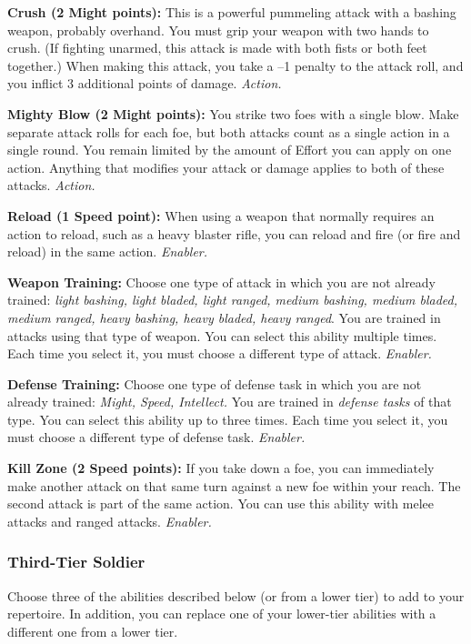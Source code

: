 \documentclass[a4paper,10pt,final,twocolumn,oneside]{book}
\newcommand{\itemAbility}[2]{\textcolor{25gray}{\textbullet\textbf{ #1:}}{ #2}\par}
\newcommand{\enabler}{\textit{ Enabler.}}
\newcommand{\action}{\textit{ Action.}}
\begin{document}
\itemAbility{Crush (2 Might points)}{This is a powerful pummeling attack with a bashing weapon, probably overhand. You must grip your weapon with two hands to crush. (If fighting unarmed, this attack is made with both fists or both feet together.) When making this attack, you take a –1 penalty to the attack roll, and you inflict 3 additional points of damage.\action}

\itemAbility{Mighty Blow (2 Might points)}{You strike two foes with a single blow. Make separate attack rolls for each foe, but both attacks count as a single action in a single round. You remain limited by the amount of Effort you can apply on one action. Anything that modifies your attack or damage applies to both of these attacks.\action}

\itemAbility{Reload (1 Speed point)}{When using a weapon that normally requires an action to reload, such as a heavy blaster rifle, you can reload and fire (or fire and reload) in the same action.\enabler}

\itemAbility{Weapon Training}{Choose one type of attack in which you are not already trained: \textit{light bashing, light bladed, light ranged, medium bashing, medium bladed, medium ranged, heavy bashing, heavy bladed, heavy ranged}. You are trained in attacks using that type of weapon. You can select this ability multiple times. Each time you select it, you must choose a different type of attack.\enabler}

\itemAbility{Defense Training}{Choose one type of defense task in which you are not already trained: \textit{Might, Speed, Intellect.} You are trained in \emph{defense tasks} of that type. You can select this ability up to three times. Each time you select it, you must choose a different type of defense task.\enabler}

\itemAbility{Kill Zone (2 Speed points)}{If you take down a foe, you can immediately make another attack on that same turn against a new foe within your reach. The second attack is part of the same action. You can use this ability with melee attacks and ranged attacks.\enabler}


\subsubsection*{Third-Tier Soldier}
\label{subsub:soldierThirdTier}

Choose three of the abilities described below (or from a lower tier) to add to your repertoire. In addition, you can replace one of your lower-tier abilities with a different one from a lower tier.
\end{document}
